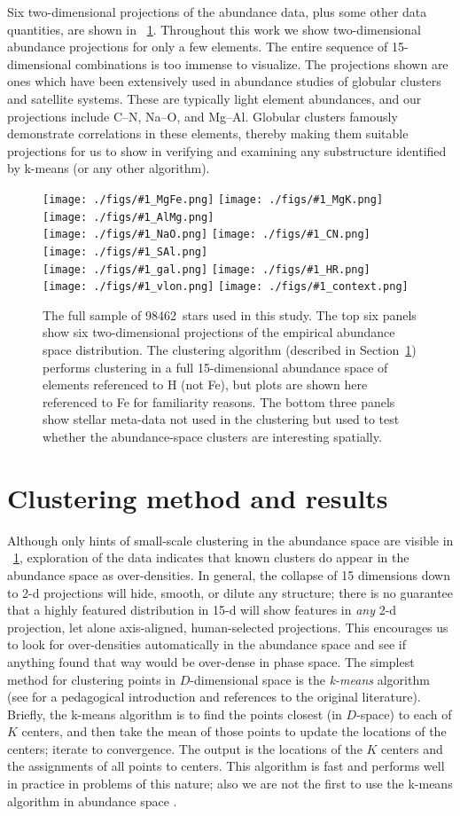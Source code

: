 \documentclass[12pt, letterpaper, preprint]{aastex}
\newcommand{\sectionname}{Section}
\newcommand{\insanefigure}[1]{%
\texttt{[image: ./figs/\#1\_MgFe.png]}%
\texttt{[image: ./figs/\#1\_MgK.png]}%
\texttt{[image: ./figs/\#1\_AlMg.png]}\\
\texttt{[image: ./figs/\#1\_NaO.png]}%
\texttt{[image: ./figs/\#1\_CN.png]}%
\texttt{[image: ./figs/\#1\_SAl.png]}\\
\texttt{[image: ./figs/\#1\_gal.png]}%
\texttt{[image: ./figs/\#1\_HR.png]}\\
\texttt{[image: ./figs/\#1\_vlon.png]}%
\texttt{[image: ./figs/\#1\_context.png]}}
\newcommand{\totalnumber}{98462}
\begin{document}
Six two-dimensional projections of the abundance data, plus some other
data quantities, are shown in \figurename~\ref{fig:all}.  Throughout
this work we show two-dimensional abundance projections for only a few
elements. The entire sequence of 15-dimensional combinations is too
immense to visualize. The projections shown are ones which
have been extensively used in abundance studies of globular clusters
and satellite systems. These are typically light element abundances,
and our projections include C--N, Na--O, and Mg--Al. Globular clusters
famously demonstrate correlations in these elements, thereby making
them suitable projections for us to show in verifying and examining
any substructure identified by k-means (or any other algorithm).

\begin{figure}[!p]
\insanefigure{all}
\caption{The full sample of \totalnumber\ stars used in this study.
  The top six panels show six two-dimensional projections of the
  empirical abundance space distribution.
  The clustering algorithm (described in
  \sectionname~\ref{sec:method}) performs clustering in a full
  15-dimensional abundance space of elements referenced to H (not Fe),
  but plots are shown here referenced to Fe for familiarity reasons.
  The bottom three panels show stellar meta-data not used in the
  clustering but used to test whether the abundance-space clusters
  are interesting spatially.\label{fig:all}}
\end{figure}

\clearpage
\section{Clustering method and results}\label{sec:method}

Although only hints of small-scale clustering in the abundance space
are visible in \figurename~\ref{fig:all}, exploration of the data indicates that
known clusters do appear in the abundance space as over-densities.
In general, the collapse of 15 dimensions down to 2-d projections
will hide, smooth, or dilute any structure; there is no guarantee that
a highly featured distribution in 15-d will show features in
\emph{any} 2-d projection, let alone axis-aligned, human-selected projections.
This encourages us to look for over-densities automatically in the
abundance space and see if anything found that way would be over-dense
in phase space.
The simplest method for clustering points in $D$-dimensional space is
the \emph{k-means} algorithm (see \citealt{bishop} for a pedagogical
introduction and references to the original literature).
Briefly, the k-means algorithm is to find the points closest (in
$D$-space) to each of $K$ centers, and then take the mean of those
points to update the locations of the centers; iterate to convergence.
The output is the locations of the $K$ centers and the assignments of
all points to centers.
This algorithm is fast and performs well in practice in problems of
this nature; also we are not the first to use the k-means algorithm in
abundance space \citep{gratton}.
\end{document}
